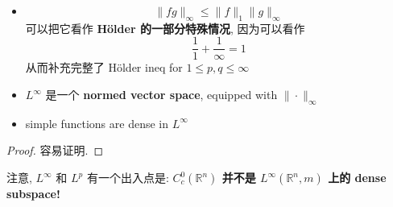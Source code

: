 \documentclass[lang=cn,11pt]{elegantbook}
\begin{document}
\begin{theorem}
    \begin{itemize}
        \item \[ \|fg\|_\infty \leq \|f\|_1 \|g\|_\infty\]
可以把它看作 \textbf{Hölder 的一部分特殊情况}, 因为可以看作 \[ \frac{1}{1} + \frac{1}{\infty} = 1\] 从而补充完整了 Hölder ineq for $1 \leq p,q\leq \infty$
        \item $L^\infty$ 是一个 \textbf{normed vector space}, equipped with $\| \cdot \|_\infty$
        \item simple functions are dense in $L^\infty$
    \end{itemize}
\end{theorem}
\begin{proof}
    容易证明. 
\end{proof}
\begin{remark}
    注意, $L^\infty$ 和 $L^p$ 有一个出入点是: \textbf{$C_c^0(\mathbb{R}^n)$ 并不是 $L^\infty (\mathbb{R}^n, m)$ 上的 dense subspace!}\\
\end{remark}
\end{document}
